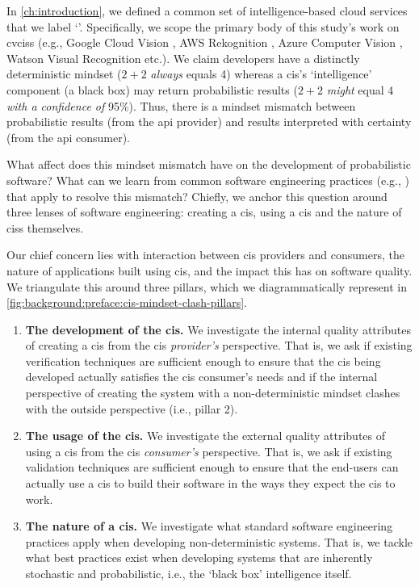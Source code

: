 \label{sec:background:preface}

In \cref{ch:introduction}, we defined a common set of intelligence-based cloud services that we label `'. Specifically, we scope the primary body of this study's work on \glspl{cvcis} (e.g., Google Cloud Vision \citep{GoogleCloud:Home}, AWS Rekognition \citep{AWS:Home}, Azure Computer Vision \citep{Azure:Home}, Watson Visual Recognition \citep{IBM:Home} etc.). We claim developers have a distinctly deterministic mindset ($2+2$ \textit{always}  equals 4) whereas a \gls{cis}'s `intelligence' component (a black box) may return probabilistic results ($2+2$ \textit{might} equal 4 \textit{with a confidence of} 95\%). Thus, there is a mindset mismatch between probabilistic results (from the \gls{api} provider) and results interpreted with certainty (from the \gls{api} consumer).

What affect does this mindset mismatch have on the development of probabilistic software? What can we learn from common software engineering practices (e.g., \citep{Pressman:2005vf,Sommerville:2011uc}) that apply to resolve this mismatch? Chiefly, we anchor this question around three lenses of software engineering: creating a \gls{cis}, using a \gls{cis} and the nature of \glspl{cis} themselves.

Our chief concern lies with interaction between \gls{cis} providers and consumers, the nature of applications built using \gls{cis}, and the impact this has on software quality. We triangulate this around three pillars, which we diagrammatically represent in \cref{fig:background:preface:cis-mindset-clash-pillars}.
 
\begin{enumerate}[label=\textbf{\arabic*}.]
\item \textbf{The development of the \gls{cis}.} We investigate the internal quality attributes of creating a \gls{cis} from the \gls{cis} \textit{provider's} perspective. That is, we ask if existing verification techniques are sufficient enough to ensure that the \gls{cis} being developed actually satisfies the \gls{cis} consumer's needs and if the internal perspective of creating the system with a non-deterministic mindset clashes with the outside perspective (i.e., pillar 2).
\item \textbf{The usage of the \gls{cis}.} We investigate the external quality attributes of using a \gls{cis} from the \gls{cis} \textit{consumer's} perspective. That is, we ask if existing validation techniques are sufficient enough to ensure that the end-users can actually use a \gls{cis} to build their software in the ways they expect the \gls{cis} to work.
\item \textbf{The nature of a \gls{cis}.} We investigate what standard software engineering practices apply when developing non-deterministic systems. That is, we tackle what best practices exist when developing systems that are inherently stochastic and probabilistic, i.e., the `black box' intelligence itself.
\end{enumerate}

